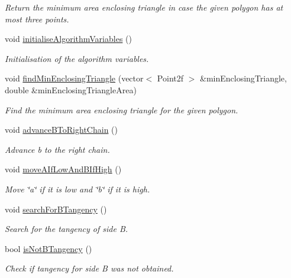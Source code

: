 \begin{DoxyCompactItemize}
\begin{DoxyCompactList}\small\item\em \-Return the minimum area enclosing triangle in case the given polygon has at most three points. \end{DoxyCompactList}\item 
void \hyperlink{classmultiscale_1_1MinEnclosingTriangleFinder_ab41a0d36789e6dfb720325ce494b21f6}{initialise\-Algorithm\-Variables} ()
\begin{DoxyCompactList}\small\item\em \-Initialisation of the algorithm variables. \end{DoxyCompactList}\item 
void \hyperlink{classmultiscale_1_1MinEnclosingTriangleFinder_afe968e24fdc374841baa8fe21a6d8270}{find\-Min\-Enclosing\-Triangle} (vector$<$ \-Point2f $>$ \&min\-Enclosing\-Triangle, double \&min\-Enclosing\-Triangle\-Area)
\begin{DoxyCompactList}\small\item\em \-Find the minimum area enclosing triangle for the given polygon. \end{DoxyCompactList}\item 
void \hyperlink{classmultiscale_1_1MinEnclosingTriangleFinder_a55faab1deabea3b838490a4a3b62cafc}{advance\-B\-To\-Right\-Chain} ()
\begin{DoxyCompactList}\small\item\em \-Advance b to the right chain. \end{DoxyCompactList}\item 
void \hyperlink{classmultiscale_1_1MinEnclosingTriangleFinder_a88ca299e33ef6104513bd153501d5530}{move\-A\-If\-Low\-And\-B\-If\-High} ()
\begin{DoxyCompactList}\small\item\em \-Move \char`\"{}a\char`\"{} if it is low and \char`\"{}b\char`\"{} if it is high. \end{DoxyCompactList}\item 
void \hyperlink{classmultiscale_1_1MinEnclosingTriangleFinder_a7064b538e01622880b6a044e84d3ad0e}{search\-For\-B\-Tangency} ()
\begin{DoxyCompactList}\small\item\em \-Search for the tangency of side \-B. \end{DoxyCompactList}\item 
bool \hyperlink{classmultiscale_1_1MinEnclosingTriangleFinder_a9f071f42dbaff51c8975da1b77c1188e}{is\-Not\-B\-Tangency} ()
\begin{DoxyCompactList}\small\item\em \-Check if tangency for side \-B was not obtained. \end{DoxyCompactList}\item 

\end{DoxyCompactItemize}
